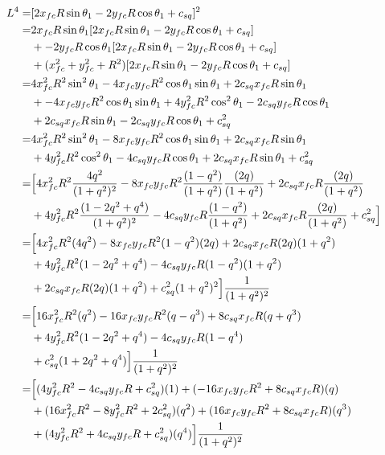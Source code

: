 \documentclass[12pt]{article}
\begin{document}
\begin{align}
    L^4 =& [2x_{fc}R\sin\theta_1  - 2y_{fc}R\cos\theta_1 + c_{sq}]^2\\
    =& 2x_{fc}R\sin\theta_1[2x_{fc}R\sin\theta_1  - 2y_{fc}R\cos\theta_1 + c_{sq}] \nonumber\\
    &+ - 2y_{fc}R\cos\theta_1[ 2x_{fc}R\sin\theta_1  - 2y_{fc}R\cos\theta_1 + c_{sq}] \nonumber\\
    &+ (x_{fc}^2 + y_{fc}^2 + R^2)[2x_{fc}R\sin\theta_1  - 2y_{fc}R\cos\theta_1 + c_{sq}]\\
    =& 4x_{fc}^2R^2\sin^2\theta_1 - 4x_{fc}y_{fc}R^2\cos\theta_1\sin\theta_1 + 2c_{sq}x_{fc}R\sin\theta_1 \nonumber\\
    &+ -4x_{fc}y_{fc}R^2\cos\theta_1\sin\theta_1  + 4y_{fc}^2R^2\cos^2\theta_1 - 2c_{sq}y_{fc}R\cos\theta_1 \nonumber\\
    &+ 2c_{sq}x_{fc}R\sin\theta_1  - 2c_{sq}y_{fc}R\cos\theta_1 + c_{sq}^2 \\
    =& 4x_{fc}^2R^2\sin^2\theta_1 - 8x_{fc}y_{fc}R^2\cos\theta_1\sin\theta_1 + 2c_{sq}x_{fc}R\sin\theta_1 \nonumber\\
    &+ 4y_{fc}^2R^2\cos^2\theta_1 - 4c_{sq}y_{fc}R\cos\theta_1 + 2c_{sq}x_{fc}R\sin\theta_1 + c_{sq}^2\\
    =& \Bigl[ 4x_{fc}^2R^2\frac{4q^2}{(1+q^2)^2} - 8x_{fc}y_{fc}R^2\frac{(1-q^2)}{(1+q^2)}\frac{(2q)}{(1+q^2)} + 2c_{sq}x_{fc}R\frac{(2q)}{(1+q^2)} \nonumber\\
    &+ 4y_{fc}^2R^2\frac{(1-2q^2+q^4)}{(1+q^2)^2} - 4c_{sq}y_{fc}R\frac{(1-q^2)}{(1+q^2)} + 2c_{sq}x_{fc}R\frac{(2q)}{(1+q^2)} + c_{sq}^2 \Bigr] \\
    =& \Bigl[ 4x_{fc}^2R^2(4q^2) - 8x_{fc}y_{fc}R^2(1-q^2)(2q) + 2c_{sq}x_{fc}R(2q)(1+q^2) \nonumber\\
    &+ 4y_{fc}^2R^2(1-2q^2+q^4) - 4c_{sq}y_{fc}R(1-q^2)(1+q^2) \nonumber\\
    &+ 2c_{sq}x_{fc}R(2q)(1+q^2) + c_{sq}^2(1+q^2)^2 \Bigr]\frac{1}{(1+q^2)^2}\\
    =& \Bigl[ 16x_{fc}^2R^2(q^2) - 16x_{fc}y_{fc}R^2(q-q^3) + 8c_{sq}x_{fc}R(q+q^3) \nonumber\\
    &+ 4y_{fc}^2R^2(1-2q^2+q^4) - 4c_{sq}y_{fc}R(1-q^4) \nonumber\\
    &+ c_{sq}^2(1+2q^2+q^4) \Bigr]\frac{1}{(1+q^2)^2}\\
    =& \Bigl[ (4y_{fc}^2R^2 - 4c_{sq}y_{fc}R + c_{sq}^2)(1) +  (- 16x_{fc}y_{fc}R^2 +8c_{sq}x_{fc}R )(q) \nonumber\\
    &+ (16x_{fc}^2R^2 - 8y_{fc}^2R^2 + 2c_{sq}^2)(q^2) + (16x_{fc}y_{fc}R^2 + 8c_{sq}x_{fc}R)(q^3) \nonumber\\
    &+ (4y_{fc}^2R^2 + 4c_{sq}y_{fc}R + c_{sq}^2 )(q^4) \Bigr]\frac{1}{(1+q^2)^2}
\end{align}
\end{document}
